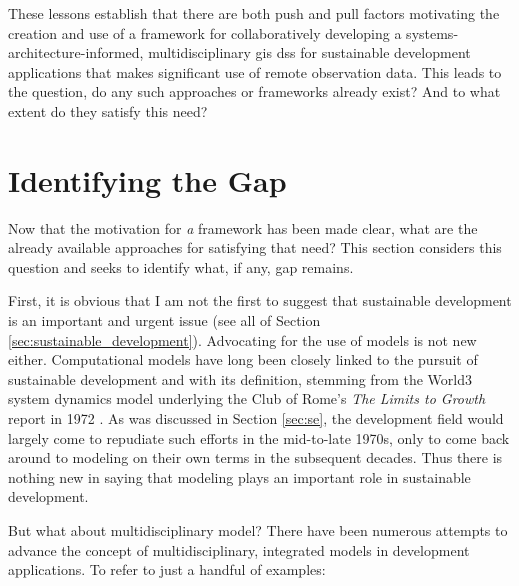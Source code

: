 \begin{itemize}[itemsep=0pt,parsep=0pt]
\end{itemize}

These lessons establish that there are both push and pull factors motivating the creation and use of a framework for collaboratively developing a systems-architecture-informed, multidisciplinary \ac{gis} \ac{dss} for sustainable development applications that makes significant use of remote observation data. This leads to the question, do any such approaches or frameworks already exist? And to what extent do they satisfy this need?

\section{Identifying the Gap} \label{sec:gap}

Now that the motivation for \textit{a} framework has been made clear, what are the already available approaches for satisfying that need? This section considers this question and seeks to identify what, if any, gap remains.

First, it is obvious that I am not the first to suggest that sustainable development is an important and urgent issue (see all of Section \ref{sec:sustainable_development}). Advocating for the use of models is not new either. Computational models have long been closely linked to the pursuit of sustainable development and with its definition, stemming from the World3 system dynamics model underlying the Club of Rome's \textit{The Limits to Growth} report in 1972 \cite{meadowsLimitsGrowth1972}. As was discussed in Section \ref{sec:se}, the development field would largely come to repudiate such efforts in the mid-to-late 1970s, only to come back around to modeling on their own terms in the subsequent decades. Thus there is nothing new in saying that modeling plays an important role in sustainable development.

But what about multidisciplinary model? There have been numerous attempts to advance the concept of multidisciplinary, integrated models in development applications. To refer to just a handful of examples:


